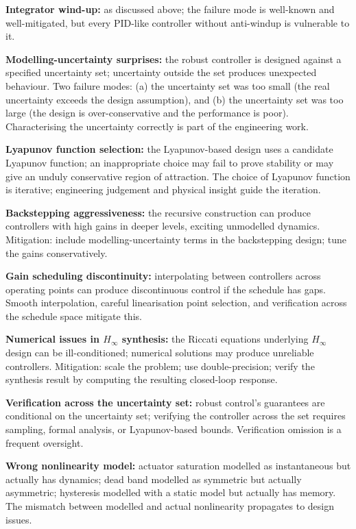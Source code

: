 \textbf{Integrator wind-up:} as discussed above; the failure mode is well-known and well-mitigated, but every PID-like controller without anti-windup is vulnerable to it.

\textbf{Modelling-uncertainty surprises:} the robust controller is designed against a specified uncertainty set; uncertainty outside the set produces unexpected behaviour. Two failure modes: (a) the uncertainty set was too small (the real uncertainty exceeds the design assumption), and (b) the uncertainty set was too large (the design is over-conservative and the performance is poor). Characterising the uncertainty correctly is part of the engineering work.

\textbf{Lyapunov function selection:} the Lyapunov-based design uses a candidate Lyapunov function; an inappropriate choice may fail to prove stability or may give an unduly conservative region of attraction. The choice of Lyapunov function is iterative; engineering judgement and physical insight guide the iteration.

\textbf{Backstepping aggressiveness:} the recursive construction can produce controllers with high gains in deeper levels, exciting unmodelled dynamics. Mitigation: include modelling-uncertainty terms in the backstepping design; tune the gains conservatively.

\textbf{Gain scheduling discontinuity:} interpolating between controllers across operating points can produce discontinuous control if the schedule has gaps. Smooth interpolation, careful linearisation point selection, and verification across the schedule space mitigate this.

\textbf{Numerical issues in $H_\infty$ synthesis:} the Riccati equations underlying $H_\infty$ design can be ill-conditioned; numerical solutions may produce unreliable controllers. Mitigation: scale the problem; use double-precision; verify the synthesis result by computing the resulting closed-loop response.

\textbf{Verification across the uncertainty set:} robust control's guarantees are conditional on the uncertainty set; verifying the controller across the set requires sampling, formal analysis, or Lyapunov-based bounds. Verification omission is a frequent oversight.

\textbf{Wrong nonlinearity model:} actuator saturation modelled as instantaneous but actually has dynamics; dead band modelled as symmetric but actually asymmetric; hysteresis modelled with a static model but actually has memory. The mismatch between modelled and actual nonlinearity propagates to design issues.

